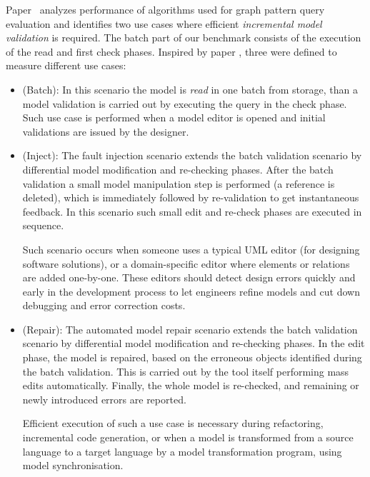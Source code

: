 Paper~\cite{icgt08-bhrv} analyzes performance of algorithms used for graph
pattern query evaluation and identifies two use cases where efficient
\emph{incremental model validation} is required. The batch part of our benchmark
consists of the execution of the read and first check phases. Inspired by paper
\cite{icgt08-bhrv}, three  were defined to measure different
use cases:
\begin{itemize}
  
  \item {} (\textsf{Batch}):
  In this scenario the model is \emph{read} in one batch from storage, than a model validation is carried out by executing the query in the check phase. Such use case is performed when a model editor is opened and initial validations are issued by the designer. 
  
  \item {} (\textsf{Inject}):
  The fault injection scenario extends the batch validation scenario by differential model modification and re-checking phases. After the batch validation a small model manipulation step is performed (\eg a reference is deleted), which is immediately followed by re-validation to get instantaneous feedback.  In this scenario such small edit and re-check phases are executed in sequence.
  
  Such scenario occurs when someone uses a typical UML editor (for designing software solutions), or a domain-specific editor where elements or relations are added one-by-one. These editors should detect design errors quickly and early in the development process to let engineers refine models and cut down debugging and error correction costs.
  
  \item {} (\textsf{Repair}):
  The automated model repair scenario extends the batch validation scenario by differential model modification and re-checking phases. In the edit phase, the model is repaired, based on the erroneous objects identified during the batch validation. This is carried out by the tool itself performing mass edits automatically. Finally, the whole model is re-checked, and remaining or newly introduced errors are reported. 
  
  Efficient execution of such a use case is necessary during refactoring, incremental code generation, or when a model is transformed from a source language to a target language by a model transformation program, using model synchronisation.

\end{itemize}


